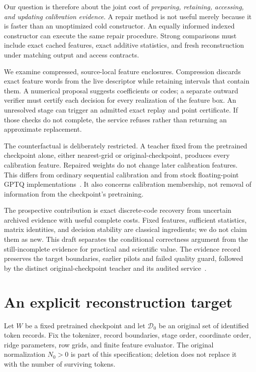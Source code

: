 \documentclass[10pt,twocolumn,letterpaper]{article}
\newcommand{\calD}{\mathcal{D}}
\begin{document}
Our question is therefore about the joint cost of \emph{preparing, retaining,
accessing, and updating calibration evidence}. A repair method is not useful
merely because it is faster than an unoptimized cold constructor. An equally
informed indexed constructor can execute the same repair procedure. Strong
comparisons must include exact cached features, exact additive statistics, and
fresh reconstruction under matching output and access contracts.

We examine compressed, source-local feature enclosures. Compression discards
exact feature words from the live descriptor while retaining intervals that
contain them. A numerical proposal suggests coefficients or codes; a separate
outward verifier must certify each decision for every realization of the feature
box. An unresolved stage can trigger an admitted exact replay and point
certificate. If those checks do not complete, the service refuses rather than
returning an approximate replacement.

The counterfactual is deliberately restricted. A teacher fixed from the pretrained
checkpoint alone, either nearest-grid or original-checkpoint, produces every
calibration feature. Repaired weights do not change later calibration features. This differs
from ordinary sequential calibration and from stock floating-point GPTQ
implementations~\cite{gptq}. It also concerns calibration membership, not removal
of information from the checkpoint's pretraining.

The prospective contribution is exact discrete-code recovery from uncertain
archived evidence with useful complete costs. Fixed features, sufficient
statistics, matrix identities, and decision stability are classical ingredients;
we do not claim them as new. This draft separates the conditional correctness
argument from the still-incomplete evidence for practical and scientific value.
The evidence record preserves the target boundaries, earlier pilots and failed
quality guard, followed by the distinct original-checkpoint teacher and its
audited service~\cite{boundaries,v58terminal,v59terminal,v62terminal}.
\section{An explicit reconstruction target}
\label{sec:target}
Let $W$ be a fixed pretrained checkpoint and let $\calD_0$ be an original set of
identified token records. Fix the tokenizer, record boundaries, stage order,
coordinate order, ridge parameters, row grids, and finite feature evaluator.
The original normalization $N_0>0$ is part of this specification; deletion does
not replace it with the number of surviving tokens.
\end{document}
